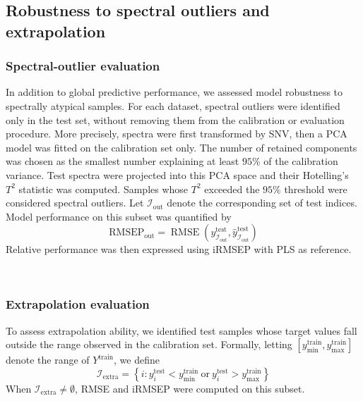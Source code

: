 \documentclass{article}
\begin{document}
\subsection{Robustness to spectral outliers and extrapolation} \label{sec:robustness}

\subsubsection{Spectral-outlier evaluation}
In addition to global predictive performance, we assessed model robustness to spectrally atypical samples. For each dataset, spectral outliers were identified only in the test set, without removing them from the calibration or evaluation procedure. More precisely, spectra were first transformed by SNV, then a PCA model was fitted on the calibration set only. The number of retained components was chosen as the smallest number explaining at least $95\%$ of the calibration variance. Test spectra were projected into this PCA space and their Hotelling's $T^2$ statistic \cite{hotelling_t2} was computed. Samples whose $T^2$ exceeded the $95\%$ threshold were considered spectral outliers. Let $\mathcal{I}_{\mathrm{out}}$ denote the corresponding set of test indices. Model performance on this subset was quantified by
\[
\mathrm{RMSEP}_{\mathrm{out}}
=
\operatorname{RMSE}\!\left(
y^{\mathrm{test}}_{\mathcal{I}_{\mathrm{out}}},
\hat{y}^{\mathrm{test}}_{\mathcal{I}_{\mathrm{out}}}
\right)
\]
Relative performance was then expressed using iRMSEP with PLS as reference.

~

\subsubsection{Extrapolation evaluation}
To assess extrapolation ability, we identified test samples whose target values fall outside the range observed in the calibration set. Formally, letting $[y_{\min}^{\mathrm{train}}, y_{\max}^{\mathrm{train}}]$ denote the range of $Y^{\mathrm{train}}$, we define
\[
\mathcal{I}_{\mathrm{extra}} =
\left\{
i : y_i^{\mathrm{test}} < y_{\min}^{\mathrm{train}}
\ \text{or}\
y_i^{\mathrm{test}} > y_{\max}^{\mathrm{train}}
\right\}
\]
When $\mathcal{I}_{\mathrm{extra}} \neq \emptyset$, RMSE and iRMSEP were computed on this subset.


\end{document}
